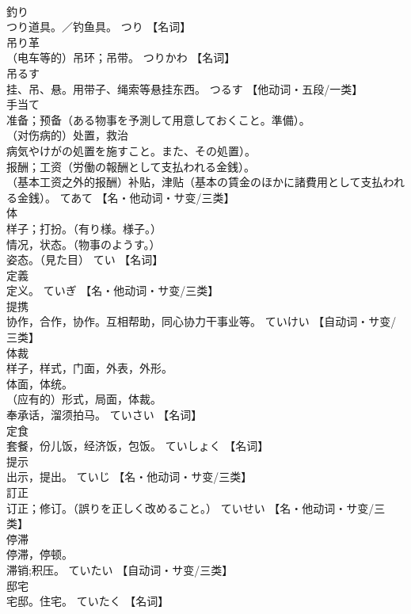 \documentclass[8pt]{extreport}
\begin{document}
\begin{CJK}{UTF8}{min}
\\	釣り	
\\	つり道具。／钓鱼具。	つり		【名词】
\\	吊り革	
\\	（电车等的）吊环；吊带。	つりかわ		【名词】
\\	吊るす	
\\	挂、吊、悬。用带子、绳索等悬挂东西。	つるす		【他动词・五段/一类】
\\	手当て	
\\	准备；预备（ある物事を予測して用意しておくこと。準備）。 
\\	（对伤病的）处置，救治
\\	病気やけがの処置を施すこと。また、その処置）。 
\\	报酬；工资（労働の報酬として支払われる金銭）。 
\\	（基本工资之外的报酬）补贴，津贴（基本の賃金のほかに諸費用として支払われる金銭）。	てあて		【名・他动词・サ变/三类】
\\	体	
\\	样子；打扮。（有り様。様子。） 
\\	情况，状态。（物事のようす。） 
\\	姿态。（見た目）	てい		【名词】
\\	定義	
\\	定义。	ていぎ		【名・他动词・サ变/三类】
\\	提携	
\\	协作，合作，协作。互相帮助，同心协力干事业等。	ていけい		【自动词・サ变/三类】
\\	体裁	
\\	样子，样式，门面，外表，外形。 
\\	体面，体统。 
\\	（应有的）形式，局面，体裁。 
\\	奉承话，溜须拍马。	ていさい		【名词】
\\	定食	
\\	套餐，份儿饭，经济饭，包饭。	ていしょく		【名词】
\\	提示	
\\	出示，提出。	ていじ		【名・他动词・サ变/三类】
\\	訂正	
\\	订正；修订。（誤りを正しく改めること。）	ていせい		【名・他动词・サ变/三类】
\\	停滞	
\\	停滞，停顿。 
\\	滞销;积压。	ていたい		【自动词・サ变/三类】
\\	邸宅	
\\	宅邸。住宅。	ていたく		【名词】

\end{CJK}
\end{document}
